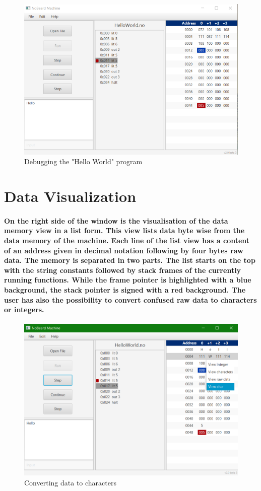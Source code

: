 \begin{figure}[h] 
	\centering
	\includegraphics[scale=.75]{images/screenshot-2.png}
	\caption{Debugging the "Hello World" program}
\end{figure}

\section{Data Visualization}
\paragraph{On the right side of the window is the visualisation of the data memory view in a list form. This view lists data byte wise from the data memory of the machine. Each line of the list view has a content of an address given in decimal notation following by four bytes raw data. The memory is separated in two parts. The list starts on the top with the string constants followed by stack frames of the currently running functions. While the frame pointer is highlighted with a blue background, the stack pointer is signed with a red background. The user has also the possibility to convert confused raw data to characters or integers.}
\begin{figure}[h] 
	\centering
	\includegraphics[scale=.60]{images/screenshot-3.png}
	\caption{Converting data to characters}
\end{figure}

